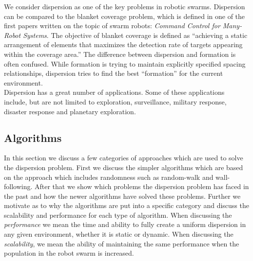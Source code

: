 
We consider dispersion as one of the key problems in robotic swarms. \cite{ugur2007dispersion,mclurkin2007distributed,ludwig2006robotic}
Dispersion can be compared to the blanket coverage problem, which is defined in one of the first papers written on the topic of swarm robots: \emph{Command Control for Many-Robot Systems}. \cite{gage1992command}
The objective of blanket coverage is defined as ``achieving a static arrangement of elements that maximizes the detection rate of targets appearing within the coverage area.'' \cite{gage1992command}
The difference between dispersion and formation is often confused.
While formation is trying to maintain explicitly specified spacing relationships, dispersion tries to find the best ``formation'' for the current environment.\\
Dispersion has a great number of applications.
Some of these applications include, but are not limited to exploration, surveillance, military response, disaster response and planetary exploration. \cite{ludwig2006robotic,Penders2011,mclurkin2007distributed} 

\subsection{Algorithms}
In this section we discuss a few categories of approaches which are used to solve the dispersion problem.
First we discuss the simpler algorithms which are based on the approach which includes randomness such as random-walk and wall-following.
After that we show which problems the dispersion problem has faced in the past and how the newer algorithms have solved these problems.
Further we motivate as to why the algorithms are put into a specific category and discuss the scalability and performance for each type of algorithm.
When discussing the \emph{performance} we mean the time and ability to fully create a uniform dispersion in any given environment, whether it is static or dynamic. When discussing the \emph{scalability}, we mean the ability of maintaining the same performance when the population in the robot swarm is increased.

